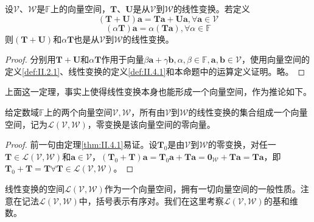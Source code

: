 \documentclass[main.tex]{subfiles}
\begin{document}
\begin{theorem}\label{thm:II.4.1}
设$\mathcal{V}$、$\mathcal{W}$是$\mathbb{F}$上的向量空间，$\mathbf{T}$、$\mathbf{U}$是从$\mathcal{V}$到$\mathcal{W}$的线性变换。若定义
\[\left(\mathbf{T}+\mathbf{U}\right)\mathbf{a}=\mathbf{Ta}+\mathbf{Ua},\forall\mathbf{a}\in\mathcal{V}\]
\[\left(\alpha\mathbf{T}\right)\mathbf{a}=\alpha\left(\mathbf{Ta}\right),\forall\alpha\in\mathbb{F}\]
则$\left(\mathbf{T}+\mathbf{U}\right)$和$\alpha\mathbf{T}$也是从$\mathcal{V}$到$\mathcal{W}$的线性变换。
\end{theorem}
\begin{proof}
分别用$\mathbf{T}+\mathbf{U}$和$\alpha\mathbf{T}$作用于向量$\beta\mathbf{a}+\gamma\mathbf{b},\alpha,\beta\in\mathbb{F},\mathbf{a},\mathbf{b}\in\mathcal{V}$，使用向量空间的定义\ref{def:II.2.1}、线性变换的定义\ref{def:II.4.1}和本命题中的运算定义证明。略。
\end{proof}

上面这一定理，事实上使得线性变换本身也能形成一个向量空间，作为推论如下。

\begin{corollary}
给定数域$\mathbb{F}$上的两个向量空间$\mathcal{V},\mathcal{W}$，所有由$\mathcal{V}$到$\mathcal{W}$的线性变换的集合组成一个向量空间，记为$\mathcal{L}\left(\mathcal{V},\mathcal{W}\right)$，零变换是该向量空间的零向量。
\end{corollary}
\begin{proof}
前一句由定理\ref{thm:II.4.1}易证。设$\mathbf{T}_0$是由$\mathcal{V}$到$\mathcal{W}$的零变换，对任一$\mathbf{T}\in\mathcal{L}\left(\mathcal{V},\mathcal{W}\right)$和$\mathbf{a}\in\mathcal{V}$，$\left(\mathbf{T}_0+\mathbf{T}\right)\mathbf{a}=\mathbf{T}_0\mathbf{a}+\mathbf{Ta}=\mathbf{0}_\mathcal{W}+\mathbf{Ta}=\mathbf{Ta}$，即$\mathbf{T}_0+\mathbf{T}=\mathbf{T}\forall\mathbf{T}\in\mathcal{L}\left(\mathcal{V},\mathcal{W}\right)$。
\end{proof}

线性变换的空间$\mathcal{L}\left(\mathcal{V},\mathcal{W}\right)$作为一个向量空间，拥有一切向量空间的一般性质。注意在记法$\mathcal{L}\left(\mathcal{V},\mathcal{W}\right)$中，括号表示有序对。我们在这里考察$\mathcal{L}\left(\mathcal{V},\mathcal{W}\right)$的基和维数。
\end{document}
